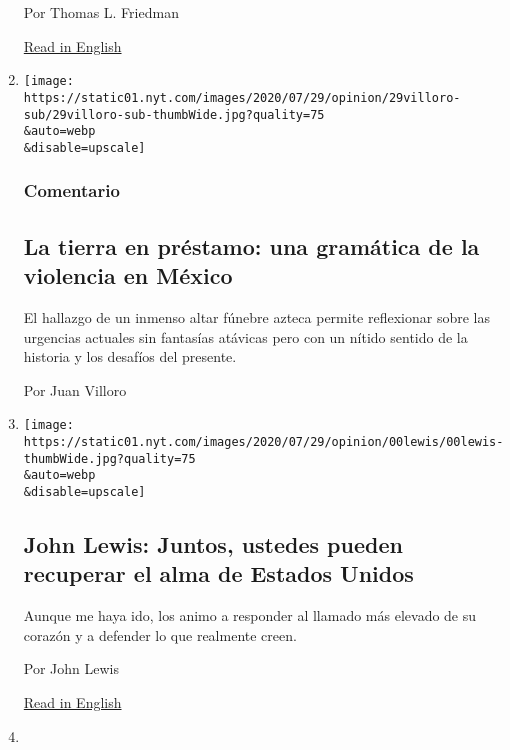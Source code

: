 \begin{enumerate}
  Por Thomas L. Friedman

  \href{https://www.nytimes.com/2020/07/28/opinion/coronavirus-masks.html}{Read
  in English}
\item
  \href{/es/2020/07/30/espanol/opinion/aztecas-violencia-narco-amlo.html}{}

  \texttt{[image: https://static01.nyt.com/images/2020/07/29/opinion/29villoro-sub/29villoro-sub-thumbWide.jpg?quality=75\\\&auto=webp\\\&disable=upscale]}

  \hypertarget{comentario-6}{%
  \subsubsection{Comentario}\label{comentario-6}}

  \hypertarget{la-tierra-en-pruxe9stamo-una-gramuxe1tica-de-la-violencia-en-muxe9xico}{%
  \subsection{La tierra en préstamo: una gramática de la violencia en
  México}\label{la-tierra-en-pruxe9stamo-una-gramuxe1tica-de-la-violencia-en-muxe9xico}}

  El hallazgo de un inmenso altar fúnebre azteca permite reflexionar
  sobre las urgencias actuales sin fantasías atávicas pero con un nítido
  sentido de la historia y los desafíos del presente.

  Por Juan Villoro
\item
  \href{/es/2020/07/30/espanol/opinion/john-lewis-derechos-civiles.html}{}

  \texttt{[image: https://static01.nyt.com/images/2020/07/29/opinion/00lewis/00lewis-thumbWide.jpg?quality=75\\\&auto=webp\\\&disable=upscale]}

  \hypertarget{john-lewis-juntos-ustedes-pueden-recuperar-el-alma-de-estados-unidos}{%
  \subsection{John Lewis: Juntos, ustedes pueden recuperar el alma de
  Estados
  Unidos}\label{john-lewis-juntos-ustedes-pueden-recuperar-el-alma-de-estados-unidos}}

  Aunque me haya ido, los animo a responder al llamado más elevado de su
  corazón y a defender lo que realmente creen.

  Por John Lewis

  \href{https://www.nytimes.com/2020/07/30/opinion/john-lewis-civil-rights-america.html}{Read
  in English}
\item
  \href{/es/2020/07/27/espanol/opinion/reabrir-escuelas-riesgo-covid.html}{}


\end{enumerate}
